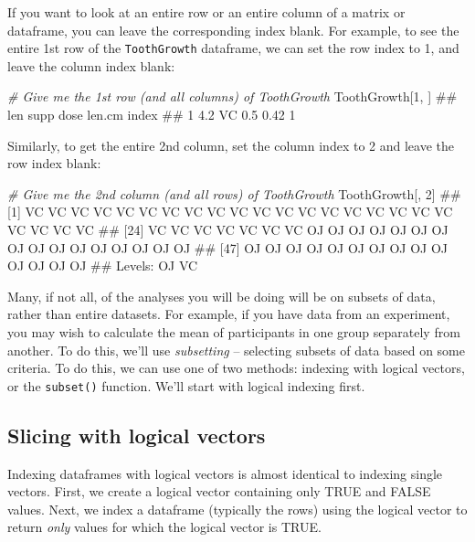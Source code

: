 \documentclass[]{book}
\newenvironment{Shaded}{\begin{snugshade}}{\end{snugshade}}
\newcommand{\DecValTok}[1]{\textcolor[rgb]{0.00,0.00,0.81}{{#1}}}
\newcommand{\CommentTok}[1]{\textcolor[rgb]{0.56,0.35,0.01}{\textit{{#1}}}}
\newcommand{\NormalTok}[1]{{#1}}
\theoremstyle{definition}
\theoremstyle{definition}
\theoremstyle{remark}
\begin{document}
If you want to look at an entire row or an entire column of a matrix or
dataframe, you can leave the corresponding index blank. For example, to
see the entire 1st row of the \texttt{ToothGrowth} dataframe, we can set
the row index to 1, and leave the column index blank:

\begin{Shaded}
\begin{Highlighting}[]
\CommentTok{# Give me the 1st row (and all columns) of ToothGrowth}
\NormalTok{ToothGrowth[}\DecValTok{1}\NormalTok{, ]}
\NormalTok{##   len supp dose len.cm index}
\NormalTok{## 1 4.2   VC  0.5   0.42     1}
\end{Highlighting}
\end{Shaded}

Similarly, to get the entire 2nd column, set the column index to 2 and
leave the row index blank:

\begin{Shaded}
\begin{Highlighting}[]
\CommentTok{# Give me the 2nd column (and all rows) of ToothGrowth}
\NormalTok{ToothGrowth[, }\DecValTok{2}\NormalTok{]}
\NormalTok{##  [1] VC VC VC VC VC VC VC VC VC VC VC VC VC VC VC VC VC VC VC VC VC VC VC}
\NormalTok{## [24] VC VC VC VC VC VC VC OJ OJ OJ OJ OJ OJ OJ OJ OJ OJ OJ OJ OJ OJ OJ OJ}
\NormalTok{## [47] OJ OJ OJ OJ OJ OJ OJ OJ OJ OJ OJ OJ OJ OJ}
\NormalTok{## Levels: OJ VC}
\end{Highlighting}
\end{Shaded}

Many, if not all, of the analyses you will be doing will be on subsets
of data, rather than entire datasets. For example, if you have data from
an experiment, you may wish to calculate the mean of participants in one
group separately from another. To do this, we'll use \emph{subsetting}
-- selecting subsets of data based on some criteria. To do this, we can
use one of two methods: indexing with logical vectors, or the
\texttt{subset()} function. We'll start with logical indexing first.

\subsection{Slicing with logical
vectors}\label{slicing-with-logical-vectors}

Indexing dataframes with logical vectors is almost identical to indexing
single vectors. First, we create a logical vector containing only TRUE
and FALSE values. Next, we index a dataframe (typically the rows) using
the logical vector to return \emph{only} values for which the logical
vector is TRUE.
\end{document}
